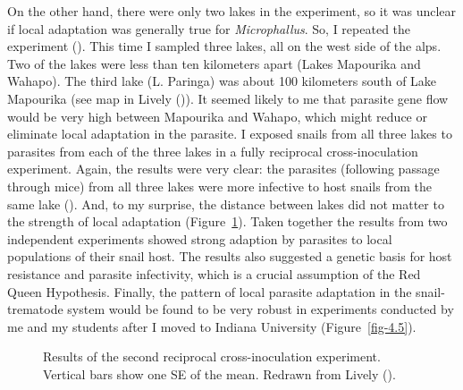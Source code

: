 \documentclass[
  letterpaper,
]{book}
\begin{document}
On the other hand, there were only two lakes in the experiment, so it
was unclear if local adaptation was generally true for
\emph{Microphallus}. So, I repeated the experiment
(). This time I sampled three
lakes, all on the west side of the alps. Two of the lakes were less than
ten kilometers apart (Lakes Mapourika and Wahapo). The third lake (L.
Paringa) was about 100 kilometers south of Lake Mapourika (see map in
Lively ()). It seemed likely to me that
parasite gene flow would be very high between Mapourika and Wahapo,
which might reduce or eliminate local adaptation in the parasite. I
exposed snails from all three lakes to parasites from each of the three
lakes in a fully reciprocal cross-inoculation experiment. Again, the
results were very clear: the parasites (following passage through mice)
from all three lakes were more infective to host snails from the same
lake (). And, to my surprise, the
distance between lakes did not matter to the strength of local
adaptation (Figure~\ref{fig-4.4}). Taken together the results from two
independent experiments showed strong adaption by parasites to local
populations of their snail host. The results also suggested a genetic
basis for host resistance and parasite infectivity, which is a crucial
assumption of the Red Queen Hypothesis. Finally, the pattern of local
parasite adaptation in the snail-trematode system would be found to be
very robust in experiments conducted by me and my students after I moved
to Indiana University (Figure~\ref{fig-4.5}).

\begin{figure}


\caption[Results of the second reciprocal cross-inoculation
experiment]{\label{fig-4.4}Results of the second reciprocal
cross-inoculation experiment. Vertical bars show one SE of the mean.
Redrawn from Lively ().}

\end{figure}%
\end{document}
